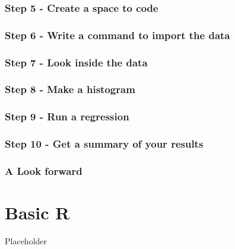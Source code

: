 \documentclass[
]{book}
\begin{document}
\hypertarget{step-5---create-a-space-to-code}{%
\subsection{Step 5 - Create a space to code}\label{step-5---create-a-space-to-code}}

\hypertarget{step-6---write-a-command-to-import-the-data}{%
\subsection{Step 6 - Write a command to import the data}\label{step-6---write-a-command-to-import-the-data}}

\hypertarget{step-7---look-inside-the-data}{%
\subsection{Step 7 - Look inside the data}\label{step-7---look-inside-the-data}}

\hypertarget{step-8---make-a-histogram}{%
\subsection{Step 8 - Make a histogram}\label{step-8---make-a-histogram}}

\hypertarget{step-9---run-a-regression}{%
\subsection{Step 9 - Run a regression}\label{step-9---run-a-regression}}

\hypertarget{step-10---get-a-summary-of-your-results}{%
\subsection{Step 10 - Get a summary of your results}\label{step-10---get-a-summary-of-your-results}}

\hypertarget{a-look-forward}{%
\subsection{A Look forward}\label{a-look-forward}}

\hypertarget{basic-r}{%
\chapter{Basic R}\label{basic-r}}

Placeholder
\end{document}
